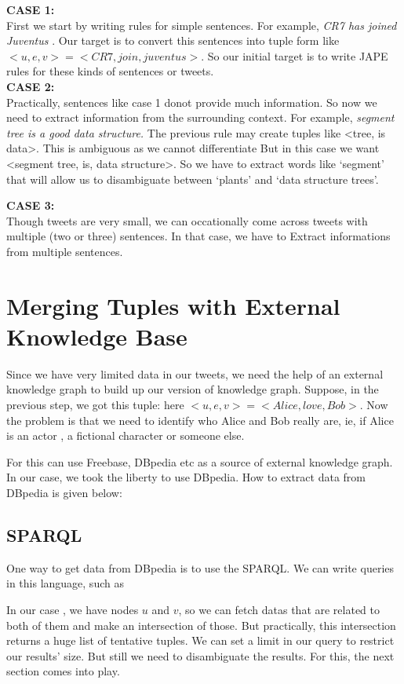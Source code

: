 \textbf{ CASE 1: } \\
First we start by writing rules for simple sentences. For example, \textit{ CR7 has joined Juventus }. Our target is to 
convert this sentences into tuple form like $<u,e,v> = <CR7 , join, juventus > $. So our initial target is to
 write JAPE rules for these kinds of sentences or tweets. \\ 

\textbf{ CASE 2: } \\
Practically, sentences like case 1 donot provide much information. So now we need to extract 
information from the surrounding context. For example, \textit{ segment tree is a good data structure. } 
The previous rule may create tuples like <tree, is data>. This is ambiguous as we cannot differentiate  But in this case we want <segment tree, is, data structure>. 
So we have to extract words like `segment' that will allow us to disambiguate between `plants' and `data structure trees'.

\textbf{ CASE 3: } \\ 
Though tweets are very small, we can occationally come across tweets with multiple (two or three) sentences. In that case,
we have to Extract informations from multiple sentences.




\section{ Merging Tuples with External Knowledge Base }
Since we have very limited data in our tweets, we need the help of an external knowledge graph to build 
up our version of knowledge graph. Suppose, in the previous step, we got this tuple:  here $<u, e, v> = <Alice, love, Bob>$.
Now the problem is that we need to identify who Alice and Bob really are, ie, if Alice is an actor , a fictional character or someone else.

For this can use Freebase, DBpedia etc as a source of external knowledge graph.
In our case, we took the liberty to use DBpedia. How to extract data from DBpedia is given below: 
\subsection{SPARQL}
One way to get data from DBpedia is to use the SPARQL. We can write queries in this language, such as 

In our case , we have nodes $ u $ and $ v $, so we can fetch datas that are related to both of them and make an intersection of those. 
But practically, this intersection returns a huge list of tentative tuples.  We can set a limit in our query to 
restrict our results' size. But still we need to disambiguate the results. For this, the next section comes into play.

